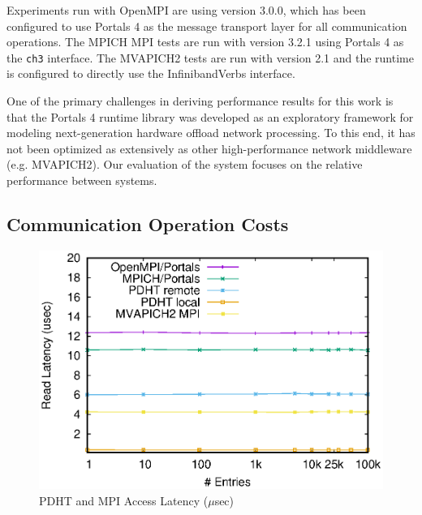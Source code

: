 Experiments run with OpenMPI are using version 3.0.0, which has been configured
to use Portals 4 as the message transport layer for all communication
operations. The MPICH MPI tests are run with version 3.2.1 using Portals 4 as
the {\tt ch3} interface. The MVAPICH2 tests are run with version 2.1 and the
runtime is configured to directly use the Infiniband\othertm Verbs interface.

One of the primary challenges in deriving performance results for this work is
that the Portals 4 runtime library was developed as an exploratory framework
for modeling next-generation hardware offload network processing. To this end,
it has not been optimized as extensively as other high-performance network
middleware (e.g. MVAPICH2). Our evaluation of the system focuses on the relative
performance between systems.






\subsection{Communication Operation Costs}

\begin{figure}[ht]
  \center
  \includegraphics[width=.95\linewidth]{plots/mpilatency}
  \caption{PDHT and MPI Access Latency ($\mu$sec)}
  \label{fig:all-latency}
\end{figure}

